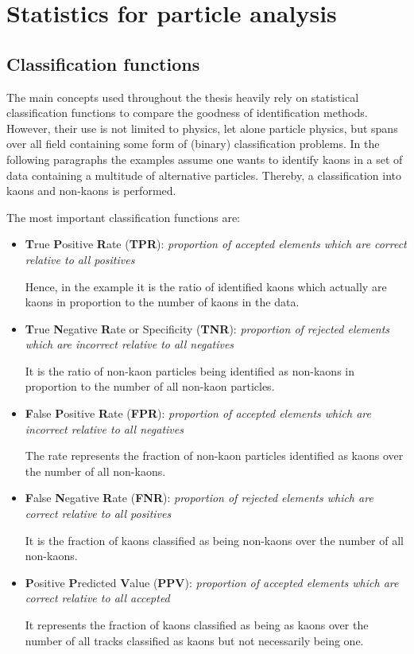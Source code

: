 \chapter{Statistics for particle analysis}
\label{chap:statistics}

\section{Classification functions}
\label{sec:classification_functions}

The main concepts used throughout the thesis heavily rely on statistical classification functions to compare the goodness of identification methods. However, their use is not limited to physics, let alone particle physics, but spans over all field containing some form of (binary) classification problems.
In the following paragraphs the examples assume one wants to identify kaons in a set of data containing a multitude of alternative particles. Thereby, a classification into kaons and non-kaons is performed.

The most important classification functions are:
\begin{itemize}
	\item \textbf{T}rue \textbf{P}ositive \textbf{R}ate (\textbf{TPR}): \textit{proportion of accepted elements which are correct relative to all positives}

	\nobreak
	Hence, in the example it is the ratio of identified kaons which actually are kaons in proportion to the number of kaons in the data.

	\item \textbf{T}rue \textbf{N}egative \textbf{R}ate or Specificity (\textbf{TNR}): \textit{proportion of rejected elements which are incorrect relative to all negatives}

	\nobreak
	It is the ratio of non-kaon particles being identified as non-kaons in proportion to the number of all non-kaon particles.

	\item \textbf{F}alse \textbf{P}ositive \textbf{R}ate (\textbf{FPR}): \textit{proportion of accepted elements which are incorrect relative to all negatives}

	\nobreak
	The rate represents the fraction of non-kaon particles identified as kaons over the number of all non-kaons.

	\item \textbf{F}alse \textbf{N}egative \textbf{R}ate (\textbf{FNR}): \textit{proportion of rejected elements which are correct relative to all positives}

	\nobreak
	It is the fraction of kaons classified as being non-kaons over the number of all non-kaons.

	\item \textbf{P}ositive \textbf{P}redicted \textbf{V}alue (\textbf{PPV}): \textit{proportion of accepted elements which are correct relative to all accepted}

	\nobreak
	It represents the fraction of kaons classified as being as kaons over the number of all tracks classified as kaons but not necessarily being one.

\end{itemize}

